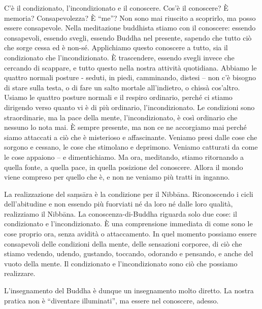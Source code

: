 C'è il condizionato, l'incondizionato e il conoscere. Cos'è il
conoscere? È memoria? Consapevolezza? È ``me''? Non sono mai riuscito a
scoprirlo, ma posso essere consapevole. Nella meditazione buddhista
stiamo con il conoscere: essendo consapevoli, essendo svegli, essendo
Buddha nel presente, sapendo che tutto ciò che sorge cessa ed è non-sé.
Applichiamo questo conoscere a tutto, sia il condizionato che
l'incondizionato. È trascendere, essendo svegli invece che cercando di
scappare, e tutto questo nella nostra attività quotidiana. Abbiamo le
quattro normali posture - seduti, in piedi, camminando, distesi -- non
c'è bisogno di stare sulla testa, o di fare un salto mortale
all'indietro, o chissà cos'altro. Usiamo le quattro posture normali e il
respiro ordinario, perché ci stiamo dirigendo verso quanto vi è di più
ordinario, l'incondizionato. Le condizioni sono straordinarie, ma la
pace della mente, l'incondizionato, è così ordinario che nessuno lo nota
mai. È sempre presente, ma non ce ne accorgiamo mai perché siamo
attaccati a ciò che è misterioso e affascinante. Veniamo presi dalle
cose che sorgono e cessano, le cose che stimolano e deprimono. Veniamo
catturati da come le cose appaiono -- e dimentichiamo. Ma ora,
meditando, stiamo ritornando a quella fonte, a quella pace, in quella
posizione del conoscere. Allora il mondo viene compreso per quello che
è, e non ne veniamo più tratti in inganno.

La realizzazione del saṃsāra è la condizione per il Nibbāna.
Riconoscendo i cicli dell'abitudine e non essendo più fuorviati né da
loro né dalle loro qualità, realizziamo il Nibbāna. La
conoscenza-di-Buddha riguarda solo due cose: il condizionato e
l'incondizionato. È una comprensione immediata di come sono le cose
proprio ora, senza avidità o attaccamento. In quel momento possiamo
essere consapevoli delle condizioni della mente, delle sensazioni
corporee, di ciò che stiamo vedendo, udendo, gustando, toccando,
odorando e pensando, e anche del vuoto della mente. Il condizionato e
l'incondizionato sono ciò che possiamo realizzare.

L'insegnamento del Buddha è dunque un insegnamento molto diretto. La nostra
pratica non è ``diventare illuminati'', ma essere nel conoscere, adesso.
